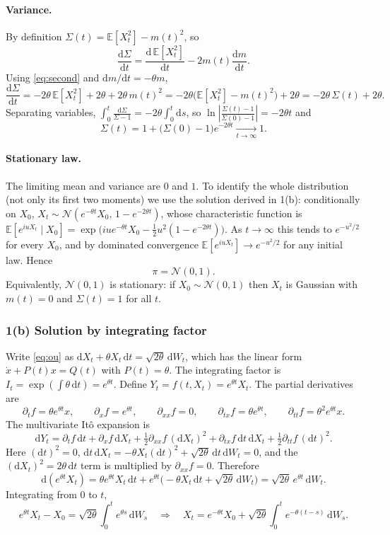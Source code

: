 \documentclass[11pt]{article}
\newcommand{\E}{\mathbb{E}}
\newcommand{\N}{\mathcal{N}}
\newcommand{\dd}{\mathrm{d}}
\begin{document}
\paragraph{Variance.} By definition $\Sigma(t) = \E[X_t^2] - m(t)^2$, so
\[
\frac{\dd\Sigma}{\dd t} = \frac{\dd\,\E[X_t^2]}{\dd t} - 2m(t)\frac{\dd m}{\dd t}.
\]
Using \eqref{eq:second} and $\dd m/\dd t = -\theta m$,
\[
\frac{\dd\Sigma}{\dd t} = -2\theta\,\E[X_t^2] + 2\theta + 2\theta\, m(t)^2
= -2\theta\bigl(\E[X_t^2]-m(t)^2\bigr) + 2\theta
= -2\theta\,\Sigma(t) + 2\theta .
\]
Separating variables, $\int_0^t \frac{\dd\Sigma}{\Sigma-1} = -2\theta\int_0^t \dd s$, so
$\ln\left|\frac{\Sigma(t)-1}{\Sigma(0)-1}\right| = -2\theta t$ and
\[
\Sigma(t) = 1 + \bigl(\Sigma(0)-1\bigr)e^{-2\theta t} \xrightarrow[t\to\infty]{} 1 .
\]

\paragraph{Stationary law.} The limiting mean and variance are $0$ and $1$. To identify the
whole distribution (not only its first two moments) we use the solution derived in 1(b):
conditionally on $X_0$, $X_t\sim\N(e^{-\theta t}X_0,\,1-e^{-2\theta t})$, whose characteristic function is
$\E[e^{iuX_t}\mid X_0] = \exp\!\bigl(iue^{-\theta t}X_0 - \tfrac12u^2(1-e^{-2\theta t})\bigr)$.
As $t\to\infty$ this tends to $e^{-u^2/2}$ for every $X_0$, and by dominated convergence
$\E[e^{iuX_t}]\to e^{-u^2/2}$ for any initial law. Hence
\[
\boxed{\pi = \N(0,1).}
\]
Equivalently, $\N(0,1)$ is stationary: if $X_0\sim\N(0,1)$ then $X_t$ is Gaussian with
$m(t)=0$ and $\Sigma(t)=1$ for all $t$.

\subsubsection*{1(b) Solution by integrating factor}

Write \eqref{eq:ou} as $\dd X_t + \theta X_t\,\dd t = \sqrt{2\theta}\,\dd W_t$, which has the linear form
$\dot x + P(t)x = Q(t)$ with $P(t)=\theta$. The integrating factor is
$I_t = \exp\!\left(\int\theta\,\dd t\right) = e^{\theta t}$. Define
$Y_t = f(t,X_t) = e^{\theta t}X_t$. The partial derivatives are
\[
\partial_t f = \theta e^{\theta t}x,\qquad
\partial_x f = e^{\theta t},\qquad
\partial_{xx} f = 0,\qquad
\partial_{tx} f = \theta e^{\theta t},\qquad
\partial_{tt} f = \theta^2 e^{\theta t}x .
\]
The multivariate It\^o expansion is
\[
\dd Y_t = \partial_t f\,\dd t + \partial_x f\,\dd X_t + \tfrac12\partial_{xx}f\,(\dd X_t)^2
+ \partial_{tx}f\,\dd t\,\dd X_t + \tfrac12\partial_{tt}f\,(\dd t)^2 .
\]
Here $(\dd t)^2=0$, $\dd t\,\dd X_t = -\theta X_t(\dd t)^2 + \sqrt{2\theta}\,\dd t\,\dd W_t = 0$, and the
$(\dd X_t)^2 = 2\theta\,\dd t$ term is multiplied by $\partial_{xx}f=0$. Therefore
\[
\dd(e^{\theta t}X_t) = \theta e^{\theta t}X_t\,\dd t + e^{\theta t}\bigl(-\theta X_t\,\dd t + \sqrt{2\theta}\,\dd W_t\bigr)
= \sqrt{2\theta}\,e^{\theta t}\,\dd W_t .
\]
Integrating from $0$ to $t$,
\[
e^{\theta t}X_t - X_0 = \sqrt{2\theta}\int_0^t e^{\theta s}\,\dd W_s
\quad\Longrightarrow\quad
X_t = e^{-\theta t}X_0 + \sqrt{2\theta}\int_0^t e^{-\theta(t-s)}\,\dd W_s .
\]
\end{document}
